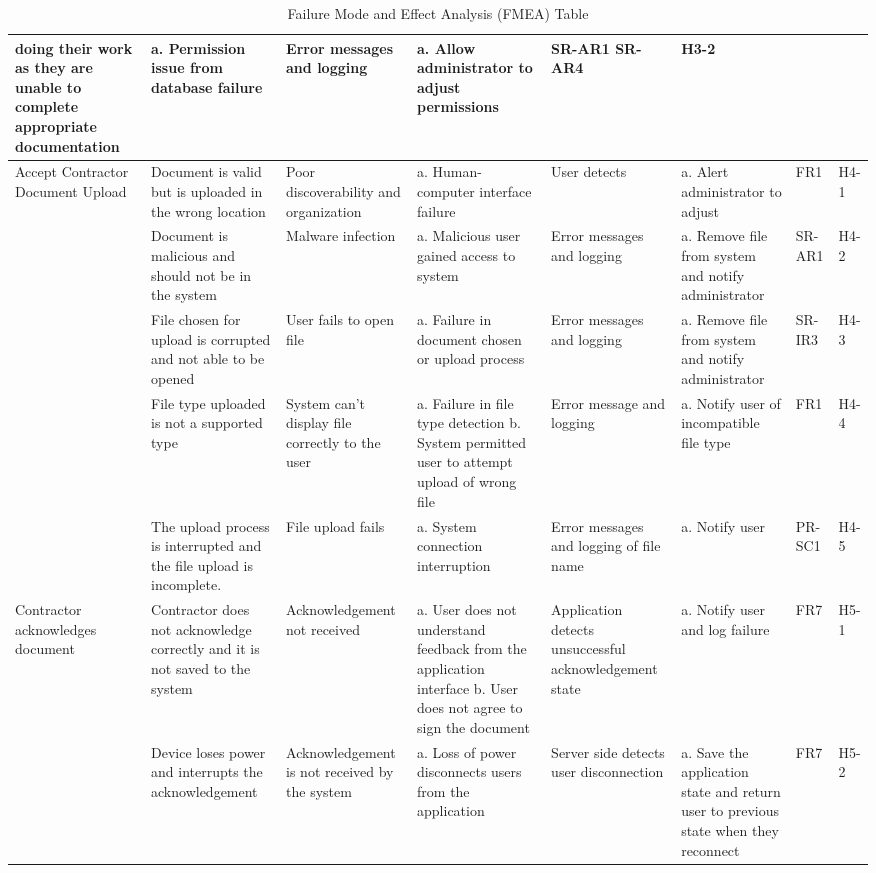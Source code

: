 \documentclass{article}
\begin{document}
\begin{table}
{\begin{tabular}{|>{\raggedright}p{2.0cm}|>{\raggedright}p{2.0cm}|>{\raggedright}p{2.5cm}|>{\raggedright}p{4cm}|>{\raggedright}p{3cm}|>{\raggedright}p{4cm}|>{\raggedright}p{1.5cm}|p{1.5cm}|}
      doing their work as they are unable to complete appropriate
      documentation & a. Permission issue from database failure &
      Error messages and logging & a. Allow administrator to adjust
      permissions & SR-AR1 \newline SR-AR4 & H3-2 \\
      \hline
      Accept Contractor Document Upload & Document is valid but is uploaded in
      the wrong location & Poor discoverability and organization &
      a. Human-computer interface failure &User detects &
      a. Alert administrator to adjust & FR1 & H4-1 \\
      \cline{2-8}
      & Document is malicious and should not be in the system & Malware
      infection &a. Malicious user gained access to system & Error messages and
      logging & a. Remove file from system and notify administrator & SR-AR1
      & H4-2 \\
      \cline{2-8}
      & File chosen for upload is corrupted and not able to be opened &
      User fails to open file &a. Failure in document chosen or upload process&
      Error messages and logging & a. Remove file from system and
      notify administrator & SR-IR3 & H4-3 \\
      \cline{2-8}
      & File type uploaded is not a supported type & System can't display
      file correctly to the user & a. Failure in file type detection
      \newline b. System permitted user to attempt upload of wrong file &
      Error message and logging & a. Notify user of incompatible file type &
      FR1 & H4-4 \\
      \cline{2-8}
      & The upload process is interrupted and the file upload is incomplete. &
      File upload fails & a. System connection interruption &
      Error messages and logging of file name & a. Notify user & PR-SC1 & H4-5\\
      \hline
      Contractor acknowledges document & Contractor does not acknowledge
      correctly and it is not saved to the system & Acknowledgement not received
      & a. User does not understand feedback from the application interface
      \newline b. User does not agree to sign the document & Application detects
      unsuccessful acknowledgement state & a. Notify user and log failure &
      FR7 & H5-1 \\
      \cline{2-8}
      & Device loses power and interrupts the acknowledgement & Acknowledgement
      is not received by the system &
      a. Loss of power disconnects users from the application & Server side
      detects user disconnection & a. Save the application state and return
      user to previous state when they reconnect & FR7 & H5-2 \\
      \hline
    \end{tabular}
  }
  \caption{Failure Mode and Effect Analysis (FMEA) Table}
\end{table}
\end{document}
